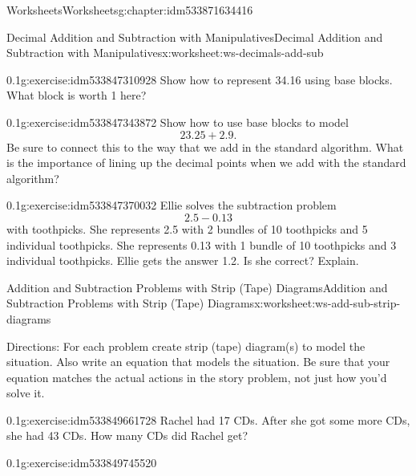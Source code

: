 \documentclass[twoside,11pt,]{book}
\begin{document}
\begin{chapterptx}{Worksheets}{}{Worksheets}{}{}{g:chapter:idm533871634416}
\begin{worksheet-section-numberless}{Decimal Addition and Subtraction with Manipulatives}{}{Decimal Addition and Subtraction with Manipulatives}{}{}{x:worksheet:ws-decimals-add-sub}
\begin{divisionexercise}{2}{}{0.1}{g:exercise:idm533847310928}%
Show how to represent 34.16 using base blocks.  What block is worth 1 here?%
\end{divisionexercise}%
\begin{divisionexercise}{3}{}{0.1}{g:exercise:idm533847343872}%
Show how to use base blocks to model%
\begin{equation*}
23.25+2.9\text{.}
\end{equation*}
Be sure to connect this to the way that we add in the standard algorithm.  What is the importance of lining up the decimal points when we add with the standard algorithm?%
\end{divisionexercise}%
\begin{divisionexercise}{4}{}{0.1}{g:exercise:idm533847370032}%
Ellie solves the subtraction problem%
\begin{equation*}
2.5-0.13
\end{equation*}
with toothpicks.  She represents 2.5 with 2 bundles of 10 toothpicks and 5 individual toothpicks.  She represents 0.13 with 1 bundle of 10 toothpicks and 3 individual toothpicks.  Ellie gets the answer 1.2.  Is she correct?  Explain.%
\end{divisionexercise}%
\end{worksheet-section-numberless}
\restoregeometry
%
%
\typeout{************************************************}
\typeout{************************************************}
%
\begin{worksheet-section-numberless}{Addition and Subtraction Problems with Strip (Tape) Diagrams}{}{Addition and Subtraction Problems with Strip (Tape) Diagrams}{}{}{x:worksheet:ws-add-sub-strip-diagrams}
\begin{introduction}{}%
Directions: For each problem create strip (tape) diagram(s) to model the situation.  Also write an equation that models the situation.  Be sure that your equation matches the actual actions in the story problem, not just how you’d solve it.%
\end{introduction}%
\begin{divisionexercise}{1}{}{0.1}{g:exercise:idm533849661728}%
Rachel had 17 CDs.  After she got some more CDs, she had 43 CDs.  How many CDs did Rachel get?%
\end{divisionexercise}%
\begin{divisionexercise}{2}{}{0.1}{g:exercise:idm533849745520}%

\end{divisionexercise}
\end{worksheet-section-numberless}
\end{chapterptx}
\end{document}
